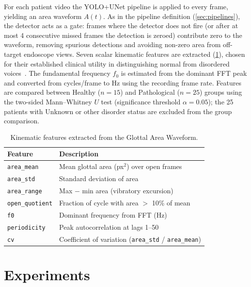 \documentclass[preprint,12pt]{elsarticle}
\newcommand{\yolounet}{YOLO+UNet}
\begin{document}
For each patient video the \yolounet{} pipeline is applied to every frame,
yielding an area waveform $A(t)$.
As in the pipeline definition (\cref{sec:pipelines}), the detector acts as a
gate: frames where the detector does not fire (or after at most
\num{4} consecutive missed frames the detection is zeroed) contribute zero
to the waveform, removing spurious detections and avoiding non-zero
area from off-target endoscope views.
Seven scalar kinematic features are extracted (\cref{tab:features}), chosen
for their established clinical utility in distinguishing normal from
disordered voices~\cite{patel2015kinematic}.
The fundamental frequency $f_0$ is estimated from the dominant FFT peak and
converted from cycles/frame to Hz using the recording frame rate.
Features are compared between Healthy (\(n{=}15\)) and Pathological
(\(n{=}25\)) groups using the two-sided Mann--Whitney $U$ test (significance
threshold $\alpha{=}0.05$); the \num{25} patients with Unknown or other disorder status
are excluded from the group comparison.

\begin{table}[t]
\centering
\caption{Kinematic features extracted from the Glottal Area Waveform.}
\label{tab:features}
\begin{tabular}{ll}
\toprule
Feature & Description \\
\midrule
\texttt{area\_mean}    & Mean glottal area (px$^2$) over open frames \\
\texttt{area\_std}     & Standard deviation of area \\
\texttt{area\_range}   & Max $-$ min area (vibratory excursion) \\
\texttt{open\_quotient}& Fraction of cycle with area $>$ 10\% of mean \\
\texttt{f0}            & Dominant frequency from FFT (Hz) \\
\texttt{periodicity}   & Peak autocorrelation at lags 1--50 \\
\texttt{cv}            & Coefficient of variation (\texttt{area\_std} / \texttt{area\_mean}) \\
\bottomrule
\end{tabular}
\end{table}

\section{Experiments}
\label{sec:experiments}
\end{document}

